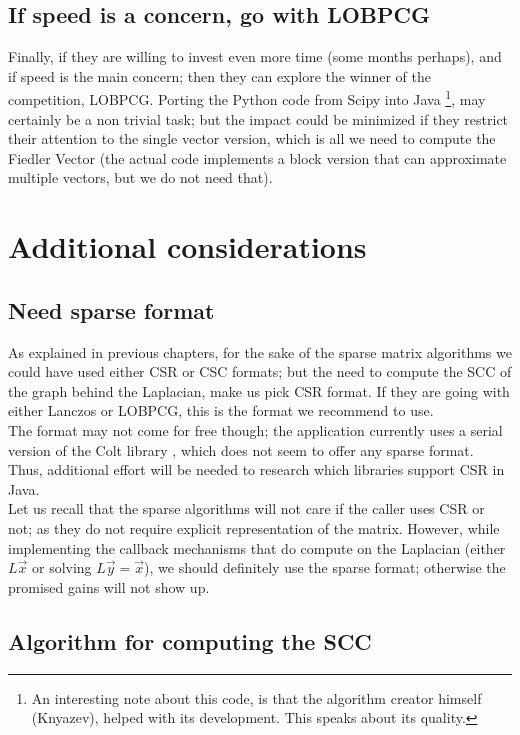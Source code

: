 \subsection{If speed is a concern, go with LOBPCG}

Finally, if they are willing to invest even more time (some months
perhaps),  and if speed is the
main concern; then they can explore the winner of the competition,
LOBPCG. Porting the Python code from Scipy into Java \footnote{An
  interesting note about this code, is that the algorithm creator
  himself (Knyazev), helped with its development. This speaks about
  its quality.}, may certainly be a non trivial task; but the impact
could be minimized if they restrict their attention to the single
vector version, which is all we need to compute the Fiedler Vector (the
actual code implements a block version that can approximate multiple
vectors, but we do not need that).

\section{Additional considerations}

\subsection{Need sparse format}

As explained in previous chapters, for the sake of the sparse matrix
algorithms we 
could have used either CSR or CSC formats; but the need to compute the
SCC of the graph behind the Laplacian, make us pick CSR
format. If they are going with either Lanczos or LOBPCG, this is the
format we recommend to use. \\

The format may not come for free though; the application currently
uses a serial version of the Colt library \cite{colt}, which does not
seem to offer any sparse format. Thus, additional effort will be
needed to research which libraries support CSR in Java. \\

Let us recall that the sparse algorithms will not care if the caller uses
CSR or not; as they do not require explicit representation of the
matrix. However, while implementing the callback mechanisms that do
compute on the Laplacian (either $L\vec{x}$ or solving $L\vec{y} =
\vec{x}$), we should definitely use the sparse format; otherwise the
promised gains will not show up.

\subsection{Algorithm for computing the SCC}

